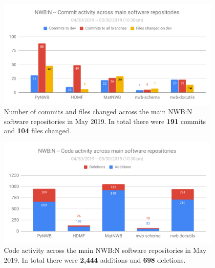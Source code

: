\documentclass{article}
\begin{document}
\begin{figure}[h!]
  \begin{minipage}[c]{0.67\textwidth}
    \includegraphics[width=\textwidth]{figures/nwbn_activity_software_commits_files.pdf}
  \end{minipage}\hfill
  \begin{minipage}[c]{0.3\textwidth}
    \caption*{Number of commits and files changed across the main NWB:N software repositories in May 2019. In total there were \textbf{191} commits and \textbf{104} files changed.} 
  \end{minipage}
\vspace{-0.3cm}
\end{figure}

\begin{figure}[h!]
  \begin{minipage}[c]{0.67\textwidth}
    \includegraphics[width=\textwidth]{figures/nwbn_activity_software_code.pdf}
  \end{minipage}\hfill
  \begin{minipage}[c]{0.3\textwidth}
    \caption*{Code activity across the main NWB:N software repositories in May 2019. In total
there were \textbf{2,444} additions and \textbf{698} deletions.} 
  \end{minipage}
\vspace{-2cm}
\end{figure}
\end{document}
